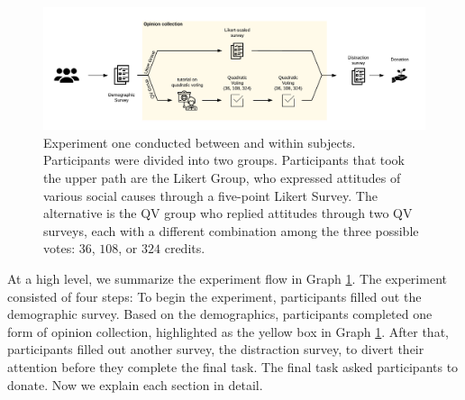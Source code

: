 \begin{figure}[htpb]
    \centering
    \includegraphics[width=\textwidth, keepaspectratio=true]{content/image/exp1_flow.pdf}
    \caption{
        Experiment one conducted between and within subjects. Participants were divided into two groups. Participants that took the upper path are the Likert Group, who expressed attitudes of various social causes through a five-point Likert Survey. The alternative is the QV group who replied attitudes through two QV surveys, each with a different combination among the three possible votes: $36$, $108$, or $324$ credits.
    }
    \label{fig:exp1_image_flow}
\end{figure}

At a high level, 
we summarize the experiment flow 
in Graph \ref{fig:exp1_image_flow}.
The experiment consisted of four steps:
To begin the experiment, 
participants filled out the demographic survey.
Based on the demographics,
participants completed one form of opinion collection,
highlighted as the yellow box
in Graph \ref{fig:exp1_image_flow}.
After that, 
participants filled out another survey,
the distraction survey,
to divert their attention before they complete the final task.
The final task asked participants to donate.
Now we explain each section in detail.


